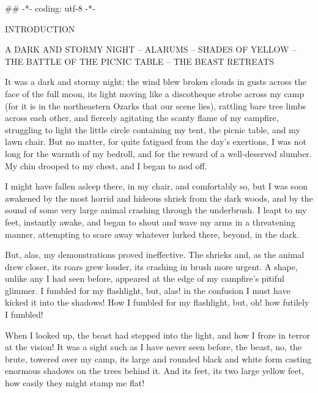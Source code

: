 ## -*- coding: utf-8 -*-
\newpage
{}
\pagestyle{fancy}
\fancyhf{}
\fancyfoot[LE,RO]{\thepage}
\begin{center}
\par
INTRODUCTION
\par
A DARK AND STORMY NIGHT – ALARUMS – SHADES OF YELLOW – THE BATTLE OF THE PICNIC TABLE – THE BEAST RETREATS
\end{center}
\par
It was a dark and stormy night; the wind blew broken clouds in gusts across the face of the full moon, its light moving like a discotheque strobe across my camp (for it is in the northeastern Ozarks that our scene lies), rattling bare tree limbs across each other, and fiercely agitating the scanty flame of my campfire, struggling to light the little circle containing my tent, the picnic table, and my lawn chair.  But no matter, for  quite fatigued from the day's exertions, I was not long for the warmth of my bedroll, and for the reward of a well-deserved slumber.  My chin drooped to my chest, and I began to nod off.
\par
I might have fallen asleep there, in my chair, and comfortably so, but I was soon awakened by the most horrid and hideous shriek from the dark woods, and by the sound of some very large animal crashing through the underbrush.  I leapt to my feet, instantly awake, and began to shout and wave my arms in a threatening manner, attempting to scare away whatever lurked there, beyond, in the dark.
\par
But, alas, my demonstrations proved ineffective.  The shrieks and, as the animal drew closer, its roars grew louder, its crashing in brush more urgent.  A shape, unlike any I had seen before, appeared at the edge of my campfire's pitiful glimmer.  I fumbled for my flashlight, but, alas! in the confusion I must have kicked it into the shadows!  How I fumbled for my flashlight, but, oh! how futilely I fumbled!
\par
When I looked up, the beast had stepped into the light, and how I froze in terror at the vision!  It was a sight such as I have never seen before, the beast, no, the brute, towered over my camp, its large and rounded black and white form casting enormous shadows on the trees behind it.  And its feet, its two large yellow feet, how easily they might stamp me flat!
\par
